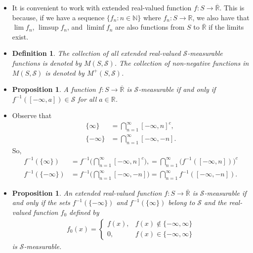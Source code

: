 \documentclass[10pt]{article}
\newtheorem{definition}[lemma]{Definition}
\newtheorem{proposition}[lemma]{Proposition}
\numberwithin{lemma}{section}
\newcommand{\mcal}[1]{\mathcal{#1}}
\newcommand{\Real}{\mathbb{R}}
\newcommand{\Nat}{\mathbb{N}}
\begin{document}
\begin{itemize}
  \item It is convenient to work with extended real-valued function $f: S \rightarrow \overline{\Real}$. This is because, if we have a sequence $\{ f_n : n \in \Nat \}$ where $f_n: S \rightarrow \Real$, we also have that $\lim f_n$, $\limsup f_n$, and $\liminf f_n$ are also functions from $S$ to $\overline{\Real}$ if the limits exist.

  \item \begin{definition} The collection of all extended real-valued $\mcal{S}$-measurable functions is denoted by $M(S,\mcal{S})$. The collection of non-negative functions in $M(S, \mcal{S})$ is denoted by $M^+(S,\mcal{S})$.
  \end{definition}

  \item \begin{proposition}
    A function $f: S \rightarrow \overline{\Real}$ is $\mcal{S}$-measurable if and only if $f^{-1}([-\infty, a]) \in \mcal{S}$ for all $a \in \Real$.
  \end{proposition}

  \item Observe that
  \begin{align*}
    \{ \infty \} &= \bigcap_{n=1}^\infty [-\infty, n]^c, \\
    \{ -\infty \} &= \bigcap_{n=1}^\infty [-\infty, -n].
  \end{align*}
  So,
  \begin{align*}
    f^{-1}(\{ \infty \}) &= f^{-1}\bigg( \bigcap_{n=1}^\infty [-\infty, n]^c \bigg), = \bigcap_{n=1}^\infty \big( f^{-1}([-\infty, n])\big)^c \\
    f^{-1}(\{ -\infty \}) &= f^{-1}\bigg( \bigcap_{n=1}^\infty [-\infty, -n]\bigg) = \bigcap_{n=1}^\infty f^{-1}([-\infty, -n]).
  \end{align*}

  \item \begin{proposition}
    An extended real-valued function $f: S \rightarrow \overline{\Real}$ is $\mcal{S}$-measurable if and only if the sets $f^{-1}(\{ -\infty \})$ and $f^{-1}(\{ \infty \})$ belong to $\mcal{S}$ and the real-valued function $f_0$ defined by
    \begin{align*}
      f_0(x) = \begin{cases}
        f(x), & f(x) \not\in \{-\infty,\infty\} \\
        0, & f(x) \in \{-\infty,\infty\}
      \end{cases}
    \end{align*}
    is $\mcal{S}$-measurable.
  \end{proposition}
  

\end{itemize}
\end{document}
